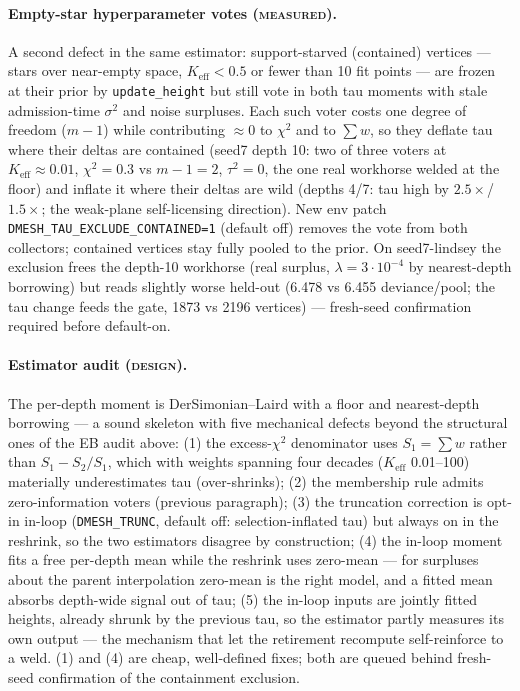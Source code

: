 \paragraph{Empty-star hyperparameter votes (\textsc{measured}).} A second
defect in the same estimator: support-starved (contained) vertices ---
stars over near-empty space, $K_{\mathrm{eff}}<0.5$ or fewer than 10 fit
points --- are frozen at their prior by \texttt{update\_height} but still
vote in both tau moments with stale admission-time $\sigma^2$ and noise
surpluses. Each such voter costs one degree of freedom ($m{-}1$) while
contributing $\approx0$ to $\chi^2$ and to $\sum w$, so they deflate tau
where their deltas are contained (seed7 depth 10: two of three voters at
$K_{\mathrm{eff}}\approx0.01$, $\chi^2=0.3$ vs $m{-}1=2$, $\tau^2=0$, the
one real workhorse welded at the floor) and inflate it where their deltas
are wild (depths 4/7: tau high by $2.5\times$/$1.5\times$; the weak-plane
self-licensing direction). New env patch
\texttt{DMESH\_TAU\_EXCLUDE\_CONTAINED=1} (default off) removes the vote
from both collectors; contained vertices stay fully pooled to the prior.
On seed7-lindsey the exclusion frees the depth-10 workhorse (real surplus,
$\lambda=3\cdot10^{-4}$ by nearest-depth borrowing) but reads slightly
worse held-out (6.478 vs 6.455 deviance/pool; the tau change feeds the
gate, 1873 vs 2196 vertices) --- fresh-seed confirmation required before
default-on.

\paragraph{Estimator audit (\textsc{design}).} The per-depth moment is
DerSimonian--Laird with a floor and nearest-depth borrowing --- a sound
skeleton with five mechanical defects beyond the structural ones of the EB
audit above: (1) the excess-$\chi^2$ denominator uses $S_1=\sum w$ rather
than $S_1-S_2/S_1$, which with weights spanning four decades
($K_{\mathrm{eff}}$ 0.01--100) materially underestimates tau
(over-shrinks); (2) the membership rule admits zero-information voters
(previous paragraph); (3) the truncation correction is opt-in in-loop
(\texttt{DMESH\_TRUNC}, default off: selection-inflated tau) but always on
in the reshrink, so the two estimators disagree by construction; (4) the
in-loop moment fits a free per-depth mean while the reshrink uses zero-mean
--- for surpluses about the parent interpolation zero-mean is the right
model, and a fitted mean absorbs depth-wide signal out of tau; (5) the
in-loop inputs are jointly fitted heights, already shrunk by the previous
tau, so the estimator partly measures its own output --- the mechanism that
let the retirement recompute self-reinforce to a weld. (1) and (4) are
cheap, well-defined fixes; both are queued behind fresh-seed confirmation
of the containment exclusion.

